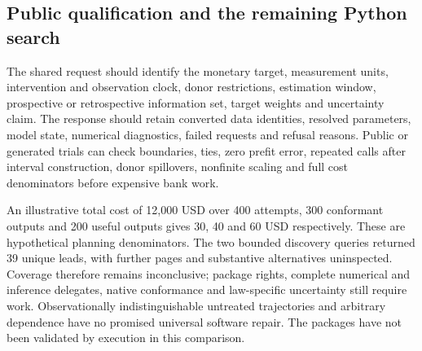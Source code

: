 \subsection{Public qualification and the remaining Python search}
The shared request should identify the monetary target, measurement units,
intervention and observation clock, donor restrictions, estimation window,
prospective or retrospective information set, target weights and uncertainty
claim. The response should retain converted data identities, resolved
parameters, model state, numerical diagnostics, failed requests and refusal
reasons. Public or generated trials can check boundaries, ties, zero
prefit error, repeated calls after interval construction, donor spillovers,
nonfinite scaling and full cost denominators before expensive bank work.
\citep{exec25_synthpy_choice}

An illustrative total cost of 12,000 USD over 400 attempts, 300 conformant
outputs and 200 useful outputs gives 30, 40 and 60 USD respectively.
These are hypothetical planning denominators. The two bounded discovery
queries returned 39 unique leads, with further pages and substantive
alternatives uninspected. Coverage therefore remains inconclusive; package
rights, complete numerical and inference delegates, native conformance and
law-specific uncertainty still require work. Observationally indistinguishable
untreated trajectories and arbitrary dependence have no promised universal
software repair. The packages have not been validated by execution in this comparison.
\citep{exec25_synthpy_choice}
